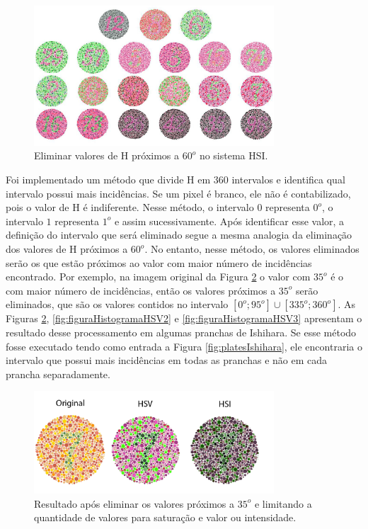 \documentclass[	12pt, Times, openright, twoside, a4paper, english, brazil]{abntex2}
\begin{document}
\begin{figure}[!htb]
\centering \includegraphics[width=0.80\textwidth]{figuraDeslocarAzulHSI.jpg}
\caption{Eliminar valores de H próximos a $60^o$ no sistema HSI.}
\label{fig:reduzirHamareloHSI}
\end{figure}

Foi implementado um método que divide H em 360 intervalos e identifica qual intervalo possui mais incidências. Se um pixel é branco, ele não é contabilizado, pois o valor de H é indiferente. Nesse método, o intervalo $0$ representa $0^o$, o intervalo $1$ representa $1^o$ e assim sucessivamente. Após identificar esse valor, a definição do intervalo que será eliminado segue a mesma analogia da eliminação dos valores de H próximos a $60^o$. No entanto, nesse método, os valores eliminados serão os que estão próximos ao valor com maior número de incidências encontrado. Por exemplo, na imagem original da Figura \ref{fig:figuraHistogramaHSV} o valor com $35^o$ é o com maior número de incidências, então os valores próximos a $35^o$ serão eliminados, que são os valores contidos no intervalo $[0^o;95^o] \cup [335^o;360^o]$. As Figuras \ref{fig:figuraHistogramaHSV}, \ref{fig:figuraHistogramaHSV2} e \ref{fig:figuraHistogramaHSV3} apresentam o resultado desse processamento em algumas pranchas de Ishihara. Se esse método fosse executado tendo como entrada a Figura \ref{fig:platesIshihara}, ele encontraria o intervalo que possui mais incidências em todas as pranchas e não em cada prancha separadamente.


\begin{figure}[!htb]
\centering \includegraphics[width=0.8\textwidth]{figuraHistograma.png}
\caption{Resultado após eliminar os valores próximos a $35^o$ e limitando a quantidade de valores para saturação e valor ou intensidade.}  \label{fig:figuraHistogramaHSV}
\end{figure}
\end{document}
